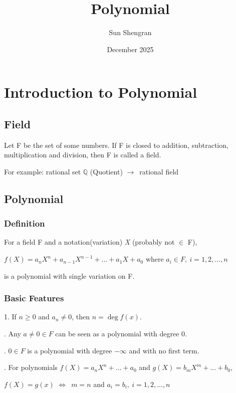 \documentclass{article}
\title{Polynomial}
\author{Sun Shengran}
\date{December 2025}
\begin{document}
\maketitle

\section{Introduction to Polynomial}
\subsection{Field}

Let F be the set of some numbers.
If F is closed to addition, subtraction, multiplication and division, then F is called a field.

\noindent
For example: rational set $\mathbb{Q}$ (Quotient) $\rightarrow$\ rational field

\subsection{Polynomial}
\subsubsection{Definition}
For a field F and a notation(variation) \textit{X} (probably not $\in$ F),

\begin{center}
$f(X) = a_n X^n + a_{n-1} X^{n-1} + ... + a_1 X + a_0$ where $a_i \in F,\ i = 1,2,...,n$
\end{center}

\noindent
is a polynomial with single variation on F.
\subsubsection{Basic Features}
1. If $n \ge 0$ and $a_n \neq 0$, then $n = \deg f(x)$.

\vspace{0.2cm}
. Any $a \neq 0 \in F$ can be seen as a polynomial with degree 0.

\vspace{0.2cm}
. $0 \in F$ is a polynomial with degree $-\infty$ and with no first term.

\vspace{0.2cm}
. For polynomials
$f(X) = a_nX^n +...+a_0$ and $g(X) = b_mX^m +...+ b_0$,

\begin{center}
$f(X) = g(x)$ $\Leftrightarrow$\ $m = n$ and $a_i = b_i,\ i = 1,2,...,n$
\end{center}
\end{document}
